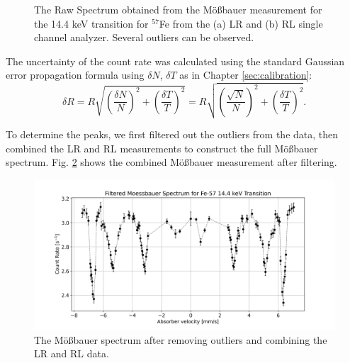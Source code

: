 \documentclass[a4paper]{report}
\numberwithin{equation}{section}
\begin{document}
\begin{figure}[htb!]
	\centering
	\quad
	\centering
	\caption{The Raw Spectrum obtained from the M\"o{\ss}bauer measurement for the 14.4 keV transition for $^{57}$Fe from the (a) LR and (b) RL 
	single channel analyzer. Several outliers can be observed.}
	\label{fig:moess_raw}
\end{figure}


The uncertainty of the count rate was calculated using the standard Gaussian error propagation formula using $\delta N$, $\delta T$ 
as in Chapter \ref{sec:calibration}:
\begin{equation}
	\delta R = R \sqrt{\left(\frac{\delta N}{N}\right)^2 + \left(\frac{\delta T}{T}\right)^2} = R \sqrt{\left(\frac{\sqrt{N}}{N}\right)^2 + \left(\frac{\delta T}{T}\right)^2} .
\end{equation} \par 


To determine the peaks, we first filtered out the outliers from the data, then combined the LR and RL measurements to construct 
the full M\"o{\ss}bauer spectrum. Fig. \ref{fig:moess_spect_filt} shows the combined M\"o{\ss}bauer measurement after filtering. \par 

\begin{figure}[htb!]
	\centering
	\includegraphics[width=0.8\columnwidth]{moess_spect_filt.png}
	\caption{The M\"o{\ss}bauer spectrum after removing outliers and combining the LR and RL data.}
	\label{fig:moess_spect_filt}
\end{figure}
\end{document}
